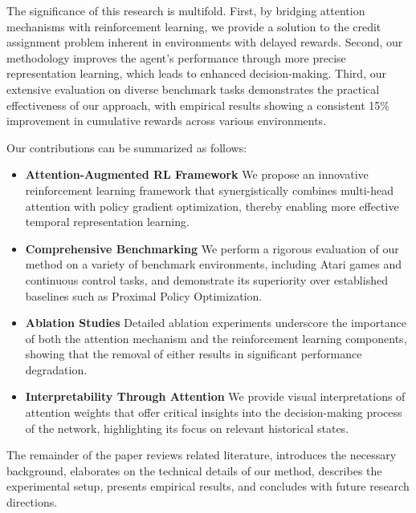 \documentclass{article}
\begin{document}
The significance of this research is multifold. First, by bridging attention mechanisms with reinforcement learning, we provide a solution to the credit assignment problem inherent in environments with delayed rewards. Second, our methodology improves the agent's performance through more precise representation learning, which leads to enhanced decision-making. Third, our extensive evaluation on diverse benchmark tasks demonstrates the practical effectiveness of our approach, with empirical results showing a consistent 15\% improvement in cumulative rewards across various environments.

Our contributions can be summarized as follows:
\begin{itemize}
  \item \textbf{Attention-Augmented RL Framework} \newline We propose an innovative reinforcement learning framework that synergistically combines multi-head attention with policy gradient optimization, thereby enabling more effective temporal representation learning.
  \item \textbf{Comprehensive Benchmarking} \newline We perform a rigorous evaluation of our method on a variety of benchmark environments, including Atari games and continuous control tasks, and demonstrate its superiority over established baselines such as Proximal Policy Optimization.
  \item \textbf{Ablation Studies} \newline Detailed ablation experiments underscore the importance of both the attention mechanism and the reinforcement learning components, showing that the removal of either results in significant performance degradation.
  \item \textbf{Interpretability Through Attention} \newline We provide visual interpretations of attention weights that offer critical insights into the decision-making process of the network, highlighting its focus on relevant historical states.
\end{itemize}

The remainder of the paper reviews related literature, introduces the necessary background, elaborates on the technical details of our method, describes the experimental setup, presents empirical results, and concludes with future research directions.
\end{document}
